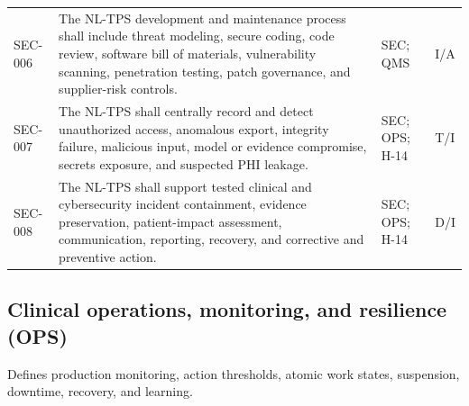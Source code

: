 \documentclass[11pt,letterpaper]{article}
\begin{document}
\begin{small}
\begin{longtable}{@{}L{0.0806\textwidth}L{0.5386\textwidth}L{0.1868\textwidth}L{0.1140\textwidth}@{}}
\addlinespace[2pt]
SEC-006 & The NL-TPS development and maintenance process shall include threat modeling, secure coding, code review, software bill of materials, vulnerability scanning, penetration testing, patch governance, and supplier-risk controls. & SEC; QMS & I\slash\allowbreak{}A \\
\addlinespace[2pt]
SEC-007 & The NL-TPS shall centrally record and detect unauthorized access, anomalous export, integrity failure, malicious input, model or evidence compromise, secrets exposure, and suspected PHI leakage. & SEC; OPS; H-14 & T\slash\allowbreak{}I \\
\addlinespace[2pt]
SEC-008 & The NL-TPS shall support tested clinical and cybersecurity incident containment, evidence preservation, patient-impact assessment, communication, reporting, recovery, and corrective and preventive action. & SEC; OPS; H-14 & D\slash\allowbreak{}I \\
\end{longtable}
\end{small}

\subsection{Clinical operations, monitoring, and resilience (OPS)}

Defines production monitoring, action thresholds, atomic work states, suspension, downtime, recovery, and learning.
\end{document}
